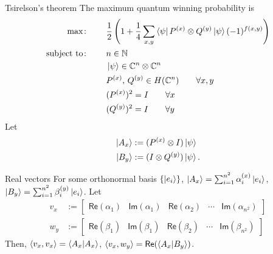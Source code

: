 \documentclass{beamer}
\begin{document}
\begin{frame}{Tsirelson's theorem}
\small
The maximum quantum winning probability is
\begin{align*}
\max\colon\qquad& \frac12\left(1 + \frac14\sum_{x,y} \bra{\psi}P^{(x)}\otimes Q^{(y)}\ket{\psi}(-1)^{f(x,y)}\right)\\
\text{subject to}\colon\qquad&
n\in\mathbb{N}\\
&\ket{\psi} \in \mathbb{C}^n\otimes\mathbb{C}^n\\
&P^{(x)},\, Q^{(y)} \in H(\mathbb{C}^n)\qquad  \forall x,y\\
&(P^{(x)})^2=I\qquad \forall x\\
&(Q^{(y)})^2=I\qquad \forall y\\
\end{align*}
Let 
\begin{align*}
\ket{A_x}&:=(P^{(x)}\otimes I)\ket{\psi}\\
\ket{B_y}&:=(I\otimes Q^{(y)})\ket{\psi}.
\end{align*}
\end{frame}

\begin{frame}{Real vectors}
For some orthonormal basis $\{\ket{e_i}\}$,
$\ket{A_x}=\sum_{i=1}^{n^2} \alpha_i^{(x)}\ket{e_i}$,
$\ket{B_y}=\sum_{i=1}^{n^2} \beta_i^{(y)}\ket{e_i}$.
Let
\begin{align*}
v_x &:= \begin{bmatrix}\mathsf{Re}(\alpha_1)& \mathsf{Im}(\alpha_1) &\mathsf{Re}(\alpha_2)&\dotsm&\mathsf{Im}(\alpha_{n^2})\end{bmatrix}\\
w_y &:= \begin{bmatrix}\mathsf{Re}(\beta_1)& \mathsf{Im}(\beta_1) &\mathsf{Re}(\beta_2)&\dotsm&\mathsf{Im}(\beta_{n^2})\end{bmatrix}
\end{align*}
Then, $\langle v_x, v_x\rangle = \braket{A_x|A_x}$, $\langle v_x, w_y\rangle = \mathsf{Re}(\braket{A_x|B_y})$.
\end{frame}
\end{document}

